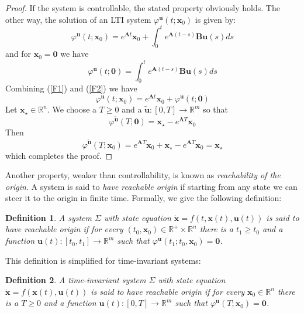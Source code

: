 \documentclass[a4paper,10pt,oneside]{book}
\newtheorem{definition}{Definition}
\begin{document}
\begin{proof}
 If the system is controllable, the stated property obviously holds. The other way, the solution of an LTI system $\varphi^{\mathbf{u}}(t;\mathbf{x}_0)$ is given by:
\begin{equation}
 \varphi^{\mathbf{u}}(t;\mathbf{x}_0)=e^{\mathbf{A}t}\mathbf{x}_0+\int_0^t e^{\mathbf{A}(t-s)}\mathbf{Bu}(s)ds\label{F1}
\end{equation}
and for $\mathbf{x}_0=\mathbf{0}$ we have
\begin{equation}
 \varphi^{\mathbf{u}}(t;\mathbf{0})=\int_0^t e^{\mathbf{A}(t-s)}\mathbf{Bu}(s)ds\label{F2}
\end{equation}
Combining (\ref{F1}) and (\ref{F2}) we have
\begin{equation}
 \varphi^{\mathbf{u}}(t;\mathbf{x}_0)=e^{\mathbf{A}t}\mathbf{x}_0+\varphi^{\mathbf{u}}(t;\mathbf{0})
\end{equation}
Let $\mathbf{x}_\star\in\mathbb{R}^n$. We choose a $T\geq 0$ and a $\tilde{\mathbf{u}}:[0,T]\to\mathbb{R}^m$ so that
\begin{equation}
 \varphi^{\tilde{\mathbf{u}}}(T;\mathbf{0})=\mathbf{x}_\star-e^{\mathbf{A}T}\mathbf{x}_0
\end{equation}
Then
\begin{equation}
 \varphi^{\tilde{\mathbf{u}}}(T;\mathbf{x}_0)=e^{\mathbf{A}T}\mathbf{x}_0+\mathbf{x}_\star-e^{\mathbf{A}T}\mathbf{x}_0=\mathbf{x}_\star
\end{equation}
which completes the proof.
\end{proof}
Another property, weaker than controllability, is known as \emph{reachability of the origin}. A system is said to \emph{have reachable origin} if starting from any state we can steer it to the origin in finite time. Formally, we give the following definition:
\begin{definition}
 A system $\Sigma$ with state equation $\dot{\mathbf{x}}=f(t,\mathbf{x}(t),\mathbf{u}(t))$ is said to have reachable origin if for every $(t_0,\mathbf{x}_0)\in\mathbb{R}^+\times\mathbb{R}^n$ there is a $t_1 \geq t_0$ and a function $\mathbf{u}(t):[t_0,t_1]\to \mathbb{R}^m$ such that $\varphi^{\mathbf{u}}(t_1;t_0,\mathbf{x}_0)=\mathbf{0}$.
\end{definition}
\noindent This definition is simplified for time-invariant systems:
\begin{definition}
 A time-invariant system $\Sigma$ with state equation $\dot{\mathbf{x}}=f(\mathbf{x}(t),\mathbf{u}(t))$ is said to have reachable origin if for every $\mathbf{x}_0\in\mathbb{R}^n$ there is a $T \geq 0$ and a function $\mathbf{u}(t):[0,T]\to \mathbb{R}^m$ such that $\varphi^{\mathbf{u}}(T;\mathbf{x}_0)=\mathbf{0}$.
\end{definition}
\end{document}

